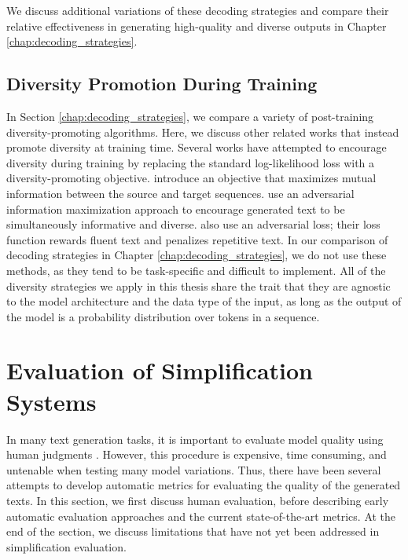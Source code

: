 \documentclass[thesis.tex]{subfiles}
\begin{document}
We discuss additional variations of these decoding strategies and compare their relative effectiveness in generating high-quality and diverse outputs in Chapter \ref{chap:decoding_strategies}.

\subsection{Diversity Promotion During Training}

In Section \ref{chap:decoding_strategies}, we compare a variety of post-training diversity-promoting algorithms. Here, we discuss other related works that instead promote diversity at training time. Several works have attempted to encourage diversity during training by replacing the standard log-likelihood loss with a diversity-promoting objective. \citet{li2016diversity} introduce an objective that maximizes mutual information between the source and target sequences. \citet{zhang2018generating} use an adversarial information maximization approach to encourage generated text to be simultaneously informative and diverse. \citet{xu2018diversity} also use an adversarial loss; their loss function rewards fluent text and penalizes repetitive text. In our comparison of decoding strategies in Chapter \ref{chap:decoding_strategies}, we do not use these methods, as they tend to be task-specific and difficult to implement. All of the diversity strategies we apply in this thesis share the trait that they are agnostic to the model architecture and the data type of the input, as long as the output of the model is a probability distribution over tokens in a sequence.

\section{Evaluation of Simplification Systems} \label{sec:eval_background}

In many text generation tasks, it is important to evaluate model quality using human judgments \citep{bojar2016ten}. However, this procedure is expensive, time consuming, and untenable when testing many model variations. Thus, there have been several attempts to develop automatic metrics for evaluating the quality of the generated texts. In this section, we first discuss human evaluation, before describing early automatic evaluation approaches and the current state-of-the-art metrics. At the end of the section, we discuss limitations that have not yet been addressed in simplification evaluation.
\end{document}
